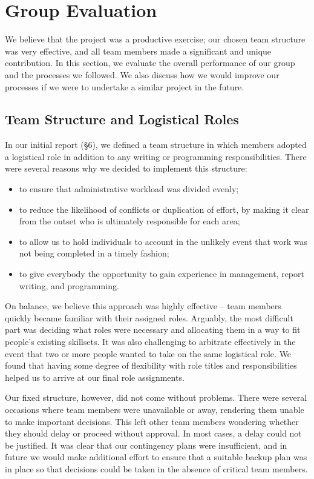 \newpage
\section{Group Evaluation}
\label{sec:group_evaluation}

We believe that the project was a productive exercise; our chosen team structure was very effective, and all team members made a significant and unique contribution. In this section, we evaluate the overall performance of our group and the processes we followed. We also discuss how we would improve our processes if we were to undertake a similar project in the future.

\subsection{Team Structure and Logistical Roles}
In our initial report (§6), we defined a team structure in which members adopted a logistical role in addition to any writing or programming responsibilities. There were several reasons why we decided to implement this structure:
\begin{itemize}[noitemsep,topsep=1pt]
	\item to ensure that administrative workload was divided evenly;
	\item to reduce the likelihood of conflicts or duplication of effort, by making it clear from the outset who is ultimately responsible for each area;
	\item to allow us to hold individuals to account in the unlikely event that work was not being completed in a timely fashion;
	\item to give everybody the opportunity to gain experience in management, report writing, and programming.
\end{itemize}

On balance, we believe this approach was highly effective -- team members quickly became familiar with their assigned roles. Arguably, the most difficult part was deciding what roles were necessary and allocating them in a way to fit people’s existing skillsets. It was also challenging to arbitrate effectively in the event that two or more people wanted to take on the same logistical role. We found that having some degree of flexibility with role titles and responsibilities helped us to arrive at our final role assignments.

Our fixed structure, however, did not come without problems. There were several occasions where team members were unavailable or away, rendering them unable to make important decisions. This left other team members wondering whether they should delay or proceed without approval. In most cases, a delay could not be justified. It was clear that our contingency plans were insufficient, and in future we would make additional effort to ensure that a suitable backup plan was in place so that decisions could be taken in the absence of critical team members.

